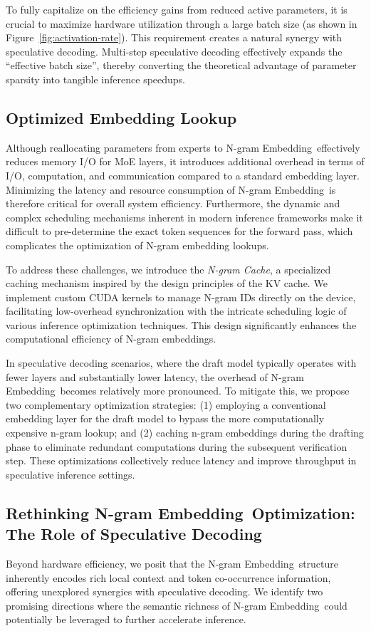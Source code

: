 \documentclass{article}
\newcommand{\method}{N-gram Embedding}
\begin{document}
To fully capitalize on the efficiency gains from reduced active parameters, it is crucial to maximize hardware utilization through a large batch size (as shown in Figure~\ref{fig:activation-rate}). This requirement creates a natural synergy with speculative decoding. Multi-step speculative decoding effectively expands the ``effective batch size'', thereby converting the theoretical advantage of parameter sparsity into tangible inference speedups.

\subsection{Optimized Embedding Lookup}
Although reallocating parameters from experts to \method\ effectively reduces memory I/O for MoE layers, it introduces additional overhead in terms of I/O, computation, and communication compared to a standard embedding layer. Minimizing the latency and resource consumption of \method\ is therefore critical for overall system efficiency. Furthermore, the dynamic and complex scheduling mechanisms inherent in modern inference frameworks make it difficult to pre-determine the exact token sequences for the forward pass, which complicates the optimization of N-gram embedding lookups.

To address these challenges, we introduce the \textit{N-gram Cache}, a specialized caching mechanism inspired by the design principles of the KV cache. We implement custom CUDA kernels to manage N-gram IDs directly on the device, facilitating low-overhead synchronization with the intricate scheduling logic of various inference optimization techniques. This design significantly enhances the computational efficiency of N-gram embeddings.

In speculative decoding scenarios, where the draft model typically operates with fewer layers and substantially lower latency, the overhead of \method\ becomes relatively more pronounced. To mitigate this, we propose two complementary optimization strategies: (1) employing a conventional embedding layer for the draft model to bypass the more computationally expensive n-gram lookup; and (2) caching n-gram embeddings during the drafting phase to eliminate redundant computations during the subsequent verification step. These optimizations collectively reduce latency and improve throughput in speculative inference settings.

\subsection{Rethinking \method\ Optimization: The Role of Speculative Decoding}
Beyond hardware efficiency, we posit that the \method\ structure inherently encodes rich local context and token co-occurrence information, offering unexplored synergies with speculative decoding. We identify two promising directions where the semantic richness of \method\ could potentially be leveraged to further accelerate inference.
\end{document}
